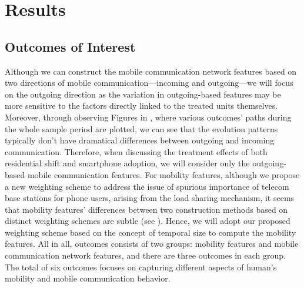 
\chapter{Results}\label{results}
\section{Outcomes of Interest}
Although we can construct the mobile communication network features based on two directions of mobile communication---incoming and outgoing---we will focus on the outgoing direction as the variation in outgoing-based features may be more sensitive to the factors directly linked to the treated units themselves.
Moreover, through observing Figures in , where various outcomes' paths during the whole sample period are plotted, we can see that the evolution patterns typically don't have dramatical differences between outgoing and incoming communication.
Therefore, when discussing the treatment effects of both residential shift and smartphone adoption, we will consider only the outgoing-based mobile communication features.
For mobility features, although we propose a new weighting scheme to address the issue of spurious importance of telecom base stations for phone users, arising from the load sharing mechanism, it seems that mobility features' differences between two construction methods based on distinct weighting schemes are subtle (see ).
Hence, we will adopt our proposed weighting scheme based on the concept of temporal size to compute the mobility features.
All in all, outcomes consists of two groups: mobility features and mobile communication network features, and there are three outcomes in each group.
The total of six outcomes focuses on capturing different aspects of human's mobility and mobile communication behavior.

